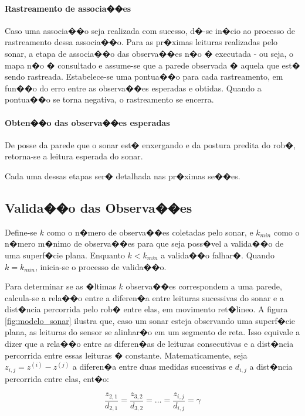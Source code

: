 \paragraph{Rastreamento de associa��es} Caso uma associa��o seja realizada com sucesso, d�-se in�cio ao processo de rastreamento dessa associa��o. Para as pr�ximas leituras realizadas pelo sonar, a etapa de associa��o das observa��es n�o � executada - ou seja, o mapa n�o � consultado e assume-se que a parede observada � aquela que est� sendo rastreada. Estabelece-se uma pontua��o para cada rastreamento, em fun��o do erro entre as observa��es esperadas e obtidas. Quando a pontua��o se torna negativa, o rastreamento se encerra.

\paragraph{Obten��o das observa��es esperadas} De posse da parede que o sonar est� enxergando e da postura predita do rob�, retorna-se a leitura esperada do sonar.

Cada uma dessas etapas ser� detalhada nas pr�ximas se��es.

\subsection{Valida��o das Observa��es}
\label{sec:validacao}
Define-se $k$ como o n�mero de observa��es coletadas pelo sonar, e $k_{min}$ como o n�mero m�nimo de observa��es para que seja poss�vel a valida��o de uma superf�cie plana. Enquanto $k<k_{min}$ a valida��o falhar�. Quando $k=k_{min}$, inicia-se o processo de valida��o.

Para determinar se as �ltimas $k$ observa��es correspondem a uma parede, calcula-se a rela��o entre a diferen�a entre leituras sucessivas do sonar e a dist�ncia percorrida pelo rob� entre elas, em movimento ret�lineo. A figura \ref{fig:modelo_sonar} ilustra que, caso um sonar esteja observando uma superf�cie plana, as leituras do sensor se alinhar�o em um segmento de reta. Isso equivale a dizer que a rela��o entre as diferen�as de leituras consecutivas e a dist�ncia percorrida entre essas leituras � constante. Matematicamente, seja $z_{i,j} = z^{(i)} - z^{(j)}$ a diferen�a entre duas medidas sucessivas e $d_{i,j}$ a dist�ncia percorrida entre elas, ent�o:

\begin{equation}
\frac{z_{2,1}}{d_{2,1}} = \frac{z_{3,2}}{d_{3,2}} = \dots = \frac{z_{i,j}}{d_{i,j}} = \gamma
\end{equation}


